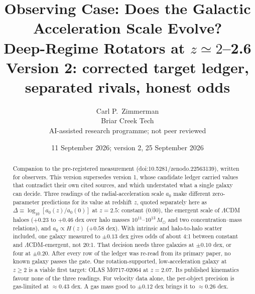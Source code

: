 \documentclass[11pt,letterpaper]{article}
\title{Observing Case: Does the Galactic Acceleration Scale Evolve?\\ Deep-Regime Rotators at $z\simeq2$--2.6 \\ \large Version 2: corrected target ledger, separated rivals, honest odds}
\author{Carl P.\ Zimmerman\\ \small Briar Creek Tech\\ \small AI-assisted research programme; not peer reviewed}
\date{11 September 2026; version 2, 25 September 2026}
\begin{document}
\maketitle
\begin{abstract}
Companion to the pre-registered measurement (doi:10.5281/zenodo.22563139), written for observers. This version
supersedes version 1, whose candidate ledger carried values that contradict their own cited sources, and which
understated what a single galaxy can decide. Three readings of the radial-acceleration scale $a_0$ make
different zero-parameter predictions for its value at redshift $z$, quoted separately here as
$\Delta\equiv\log_{10}[a_0(z)/a_0(0)]$ at $z=2.5$: constant ($0.00$), the emergent scale of $\Lambda$CDM haloes
($+0.23$ to $+0.46$ dex over halo masses $10^{11}$--$10^{13}\,M_\odot$ and two concentration--mass relations), and
$a_0\propto H(z)$ ($+0.58$ dex). With intrinsic and halo-to-halo scatter included, one galaxy measured to
$\pm0.13$ dex gives odds of about 4:1 between constant and $\Lambda$CDM-emergent, not 20:1. That decision needs
three galaxies at $\pm0.10$ dex, or four at $\pm0.20$. After every row of the ledger was re-read from its primary
paper, no known galaxy passes the gate. One rotation-supported, low-acceleration galaxy at $z\geq2$ is a viable
first target: OLAS M0717-02064 at $z=2.07$. Its published kinematics favour none of the three readings. For
velocity data alone, the per-object precision is gas-limited at $\approx0.43$ dex. A gas mass good to $\pm0.12$
dex brings it to $\approx0.26$ dex.
\end{abstract}
\end{document}
